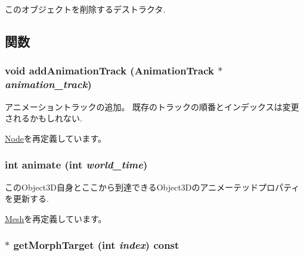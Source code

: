 このオブジェクトを削除するデストラクタ. 

\subsection{関数}
\hypertarget{classm3g_1_1MorphingMesh_415c0b110f95410ded9b85e5d99a496b}{
\subsubsection[{addAnimationTrack}]{\setlength{\rightskip}{0pt plus 5cm}void addAnimationTrack ({\bf AnimationTrack} $\ast$ {\em animation\_\-track})}}
\label{classm3g_1_1MorphingMesh_415c0b110f95410ded9b85e5d99a496b}


アニメーショントラックの追加。 既存のトラックの順番とインデックスは変更されるかもしれない. 

\hyperlink{classm3g_1_1Node_415c0b110f95410ded9b85e5d99a496b}{Node}を再定義しています。\hypertarget{classm3g_1_1MorphingMesh_8aad1ceab4c2a03609c8a42324ce484d}{
\subsubsection[{animate}]{\setlength{\rightskip}{0pt plus 5cm}int animate (int {\em world\_\-time})}}
\label{classm3g_1_1MorphingMesh_8aad1ceab4c2a03609c8a42324ce484d}


このObject3D自身とここから到達できるObject3Dのアニメーテッドプロパティを更新する. 

\hyperlink{classm3g_1_1Mesh_82cfeb67ca66b93e2ca7bda9a4f0e2aa}{Mesh}を再定義しています。\hypertarget{classm3g_1_1MorphingMesh_44766cc08b595f074d0d698c75f544b4}{
\subsubsection[{getMorphTarget}]{ $\ast$ getMorphTarget (int {\em index}) const}}
\label{classm3g_1_1MorphingMesh_44766cc08b595f074d0d698c75f544b4}


